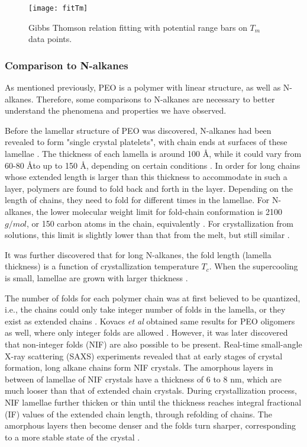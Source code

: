 \begin{figure}[H]
\center
\vspace{1 cm}
\texttt{[image: fitTm]}
\caption{Gibbs Thomson relation fitting with potential range bars on $T_{m}$ data points.}
\label{fig:fitTm}
\end{figure}

\subsubsection{Comparison to N-alkanes}

As mentioned previously, PEO is a polymer with linear structure, as well as N-alkanes. Therefore, some comparisons to N-alkanes are necessary to better understand the phenomena and properties we have observed.

Before the lamellar structure of PEO was discovered, N-alkanes had been revealed to form "single crystal platelets", with chain ends at surfaces of these lamellae \cite{Richardson1965}. The thickness of each lamella is around 100 \AA, while it could vary from 60-80 \AA  to up to 150 \AA, depending on certain conditions \cite{Keller1957a}. In order for long chains whose extended length is larger than this thickness to accommodate in such a layer, polymers are found to fold back and forth in the layer. Depending on the length of chains, they need to fold for different times in the lamellae. For N-alkanes, the lower molecular weight limit for fold-chain conformation is 2100 $g/mol$, or 150 carbon atoms in the chain, equivalently \cite{Ungar1986}. For crystallization from solutions, this limit is slightly lower than that from the melt, but still similar \cite{Alamo1993}.

It was further discovered that for long N-alkanes, the fold length (lamella thickness) is a function of crystallization temperature $T_{c}$. When the supercooling is small, lamellae are grown with larger thickness \cite{Ungar1986}. 

The number of folds for each polymer chain was at first believed to be quantized, i.e., the chains could only take integer number of folds in the lamella, or they exist as extended chains \cite{Ungar1986}. Kovacs \textit{et al} obtained same results for PEO oligomers as well, where only integer folds are allowed \cite{Kovacs1977}. However, it was later discovered that non-integer folds (NIF) are also possible to be present. Real-time small-angle X-ray scattering (SAXS) experiments \cite{Zeng1998} revealed that at early stages of crystal formation, long alkane chains form NIF crystals. The amorphous layers in between of lamellae of NIF crystals have a thickness of 6 to 8 nm, which are much looser than that of extended chain crystals. During crystallization process, NIF lamellae further thicken or thin until the thickness reaches integral fractional (IF) values of the extended chain length, through refolding of chains. The amorphous layers then become denser and the folds turn sharper, corresponding to a more stable state of the crystal \cite{Ungar1986}.

